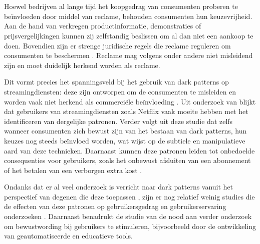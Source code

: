 \vspace{1em}

\section{}%
\label{sec:probleemstelling}

\vspace{1em}

Hoewel bedrijven al lange tijd het koopgedrag van consumenten proberen te beïnvloeden door middel van reclame, behouden consumenten hun keuzevrijheid. Aan de hand van verkregen productinformatie, demonstraties of prijsvergelijkingen kunnen zij zelfstandig beslissen om al dan niet een aankoop te doen. Bovendien zijn er strenge juridische regels die reclame reguleren om consumenten te beschermen \autocite{UNIZO2025}. Reclame mag volgens \textcite{UNIZO2025} onder andere niet misleidend zijn en moet duidelijk herkend worden als reclame. 

\vspace{1em}

Dit vormt precies het spanningsveld bij het gebruik van dark patterns op streamingdiensten: deze zijn ontworpen om de consumenten te misleiden en worden vaak niet herkend als commerciële beïnvloeding \autocite{FODEconomie2024}. Uit onderzoek van \textcite{BongardBlanchy2021} blijkt dat gebruikers van streamingdiensten zoals Netflix vaak moeite hebben met het identificeren van dergelijke patronen. Verder volgt uit deze studie dat zelfs wanneer consumenten zich bewust zijn van het bestaan van dark patterns, hun keuzes nog steeds beïnvloed worden, wat wijst op de subtiele en manipulatieve aard van deze technieken. Daarnaast kunnen deze patronen leiden tot onbedoelde consequenties voor gebruikers, zoals het onbewust afsluiten van een abonnement of het betalen van een verborgen extra kost \autocite{FODEconomie2024}.

\vspace{1em}

Ondanks dat er al veel onderzoek is verricht naar dark patterns vanuit het perspectief van degenen die deze toepassen \autocite{Kitkowska2023,Kollmer2022,OECD2022}, zijn er nog relatief weinig studies die de effecten van deze patronen op gebruikersgedrag en gebruikerservaring onderzoeken \autocite{BongardBlanchy2021}. Daarnaast benadrukt de studie van \textcite{DiGeronimo2020} de nood aan verder onderzoek om bewustwording bij gebruikers te stimuleren, bijvoorbeeld door de ontwikkeling van geautomatiseerde en educatieve tools. 

